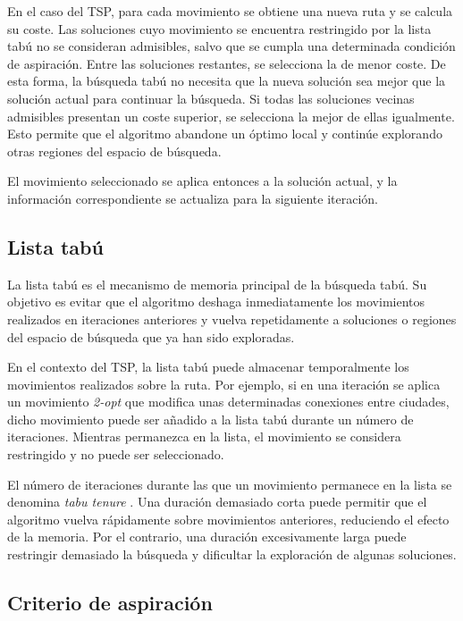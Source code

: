 En el caso del TSP, para cada movimiento se obtiene una nueva ruta y se calcula su coste. Las soluciones cuyo movimiento
se encuentra restringido por la lista tabú no se consideran admisibles, salvo que se cumpla una determinada condición de
aspiración. Entre las soluciones restantes, se selecciona la de menor coste. De esta forma, la búsqueda tabú no necesita que
la nueva solución sea mejor que la solución actual para continuar la búsqueda. Si todas las soluciones vecinas admisibles 
presentan un coste superior, se selecciona la mejor de ellas igualmente. Esto permite que el algoritmo abandone un óptimo 
local y continúe explorando otras regiones del espacio de búsqueda.

El movimiento seleccionado se aplica entonces a la solución actual, y la información correspondiente se actualiza para
la siguiente iteración.

\subsection{Lista tabú}
\label{subsec:ts_tabu_list}

La lista tabú es el mecanismo de memoria principal de la búsqueda tabú. Su objetivo es evitar que el algoritmo deshaga 
inmediatamente los movimientos realizados en iteraciones anteriores y vuelva repetidamente a soluciones o regiones
del espacio de búsqueda que ya han sido exploradas.

En el contexto del TSP, la lista tabú puede almacenar temporalmente los movimientos realizados sobre la ruta. Por ejemplo,
si en una iteración se aplica un movimiento \textit{2-opt} que modifica unas determinadas conexiones entre ciudades, dicho
movimiento puede ser añadido a la lista tabú durante un número de iteraciones. Mientras permanezca en la lista, el movimiento
se considera restringido y no puede ser seleccionado.

El número de iteraciones durante las que un movimiento permanece en la lista se denomina \textit{tabu tenure} \cite{basu2012}.
Una duración demasiado corta puede permitir que el algoritmo vuelva rápidamente sobre movimientos anteriores, reduciendo el
efecto de la memoria. Por el contrario, una duración excesivamente larga puede restringir demasiado la búsqueda y dificultar 
la exploración de algunas soluciones.

\subsection{Criterio de aspiración}
\label{subsec:ts_aspiration}

